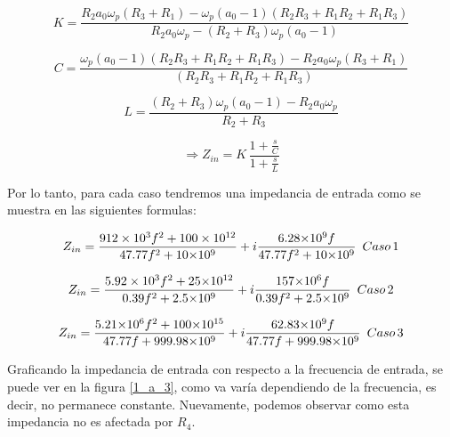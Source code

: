 \[
K=\frac{R_{2}a_{0}\omega_{p}(R_{3}+R_{1})-\omega_{p}(a_{0}-1)\left(R_{2}R_{3}+R_{1}R_{2}+R_{1}R_{3}\right)}{R_{2}a_{0}\omega_{p}-\left(R_{2}+R_{3}\right)\omega_{p}\left(a_{0}-1\right)}
\]

\[
C=\frac{\omega_{p}(a_{0}-1)\left(R_{2}R_{3}+R_{1}R_{2}+R_{1}R_{3}\right)-R_{2}a_{0}\omega_{p}\left(R_{3}+R_{1}\right)}{\left(R_{2}R_{3}+R_{1}R_{2}+R_{1}R_{3}\right)}
\]

\[
L=\frac{\left(R_{2}+R_{3}\right)\omega_{p}\left(a_{0}-1\right)-R_{2}a_{0}\omega_{p}}{R_{2}+R_{3}}
\]

\begin{equation}
\Rightarrow Z_{in}=K\,\frac{1+\frac{s}{C}}{1+\frac{s}{L}}\label{eq:1_a_2}
\end{equation}

Por lo tanto, para cada caso tendremos una impedancia de entrada como
se muestra en las siguientes formulas:

\[
Z_{in}=\frac{912\times10^{3}f^{2}+100\times10^{12}}{47.77f^{2}+10\text{\texttimes}10^{9}}+i\frac{6.28\text{\texttimes}10^{9}f}{47.77f^{2}+10\text{\texttimes}10^{9}}\,\,\,Caso\,1
\]

\[
Z_{in}=\frac{5.92\times10^{3}f^{2}+25\text{\texttimes}10^{12}}{0.39f^{2}+2.5\text{\texttimes}10^{9}}+i\frac{157\text{\texttimes}10^{6}f}{0.39f^{2}+2.5\text{\texttimes}10^{9}}\,\,\,Caso\,2
\]

\[
Z_{in}=\frac{5.21\text{\texttimes}10^{6}f^{2}+100\text{\texttimes}10^{15}}{47.77f+999.98\text{\texttimes}10^{9}}+i\frac{62.83\text{\texttimes}10^{9}f}{47.77f+999.98\text{\texttimes}10^{9}}\,\,\,Caso\,3
\]

Graficando la impedancia de entrada con respecto a la frecuencia de
entrada, se puede ver en la figura \ref{1_a_3}, como va varía dependiendo
de la frecuencia, es decir, no permanece constante. Nuevamente, podemos
observar como esta impedancia no es afectada por $R_{4}$.

